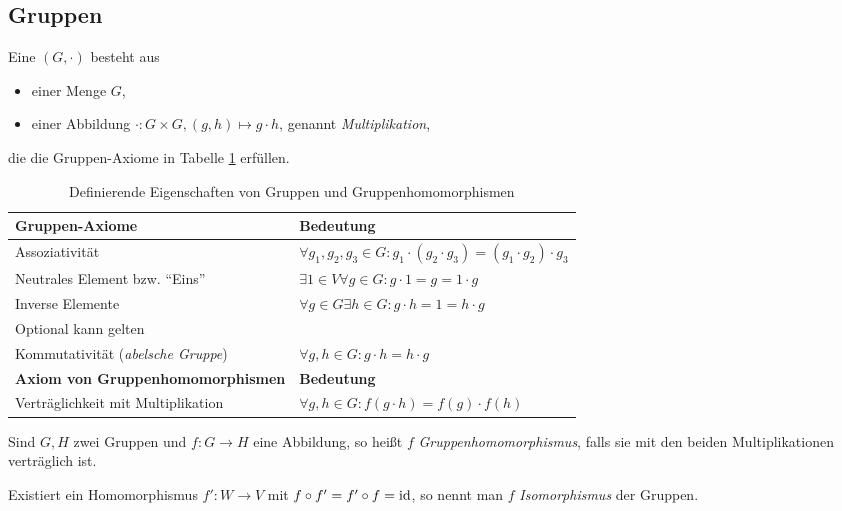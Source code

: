 \subsection{Gruppen}

\begin{definition}\label{gruppen:def}
Eine  $(G,\cdot)$ besteht aus
\begin{itemize}
	\item einer Menge $G$,
	\item einer Abbildung $\cdot: G\times G, (g,h) \mapsto g\cdot h$, genannt \emph{Multiplikation},
\end{itemize}
die die Gruppen-Axiome in Tabelle \ref{gruppen:def_table} erfüllen.

\begin{table}[!ht]
	\setlength\extrarowheight{10pt} %
	\begin{tabularx}{\textwidth}{p{7cm} X}
		
		\toprule
		\textbf{Gruppen-Axiome}                               & \textbf{Bedeutung} \\
		\midrule
        \hspace{1cm}Assoziativität                           & $\forall g_1,g_2,g_3\in G: g_1\cdot(g_2\cdot g_3) = (g_1\cdot g_2)\cdot g_3$ \\
		\hspace{1cm}Neutrales Element bzw. \enquote{Eins}    & $\exists 1\in V\forall g\in G: g\cdot 1 = g = 1\cdot g$  \\
		\hspace{1cm}Inverse Elemente                         & $\forall g \in G\exists h \in G: g\cdot h = 1 = h\cdot g$ \\
		Optional kann gelten & \\
        \hspace{1cm}Kommutativität (\emph{abelsche Gruppe})  & $\forall g,h\in G: g\cdot h=h\cdot g$ \\
        \textbf{Axiom von Gruppenhomomorphismen}             & \textbf{Bedeutung} \\
        \midrule
        Verträglichkeit mit Multiplikation & $\forall g,h\in G: f(g\cdot h) = f(g)\cdot f(h)$ \\
        \bottomrule
	\end{tabularx}
	\caption{Definierende Eigenschaften von Gruppen und Gruppenhomomorphismen}
    \label{gruppen:def_table}
\end{table}

Sind $G,H$ zwei Gruppen und $f: G\to H$ eine Abbildung, so heißt $f$ \emph{Gruppenhomomorphismus}, falls sie mit den beiden Multiplikationen verträglich ist.

Existiert ein Homomorphismus $f': W\to V$ mit $f\circ f'=f'\circ f=\operatorname{id}$, so nennt man $f$ \emph{Isomorphismus} der Gruppen.
\end{definition}


